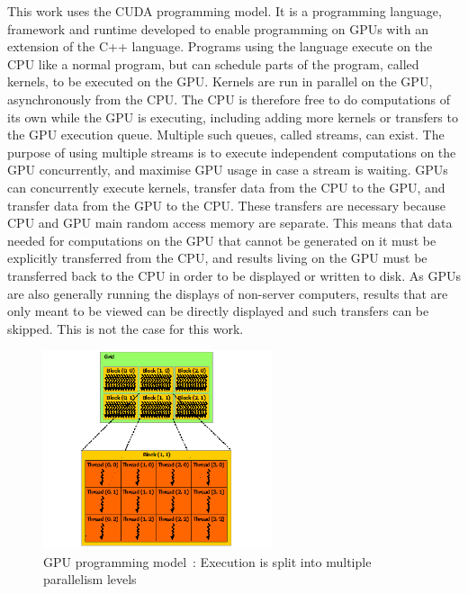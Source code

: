 This work uses the CUDA programming model. It is a programming language, framework and runtime
developed to enable programming on GPUs with an extension of the C++ language. Programs using the
language execute on the CPU like a normal program, but can schedule parts of the program, called
kernels, to be executed on the GPU. Kernels are run in parallel on the GPU, asynchronously from the
CPU. The CPU is therefore free to do computations of its own while the GPU is executing, including
adding more kernels or transfers to the GPU execution queue. Multiple such queues, called streams,
can exist. The purpose of using multiple streams is to execute independent computations on the GPU
concurrently, and maximise GPU usage in case a stream is waiting. GPUs can concurrently execute
kernels, transfer data from the CPU to the GPU, and transfer data from the GPU to the CPU. These
transfers are necessary because CPU and GPU main random access memory are separate. This means that
data needed for computations on the GPU that cannot be generated on it must be explicitly
transferred from the CPU, and results living on the GPU must be transferred back to the CPU in order
to be displayed or written to disk. As GPUs are also generally running the displays of non-server
computers, results that are only meant to be viewed can be directly displayed and such transfers can
be skipped. This is not the case for this work. 

\begin{figure}[H]
	\centering
	\includegraphics[width=0.6\textwidth]{Chapter_graphics_processing_units/media/grid-of-thread-blocks}
	\caption{GPU programming model~\cite{Nvidia2021}: Execution is split into multiple parallelism levels}
	\label{fig:gpu_programming_model}
\end{figure}

